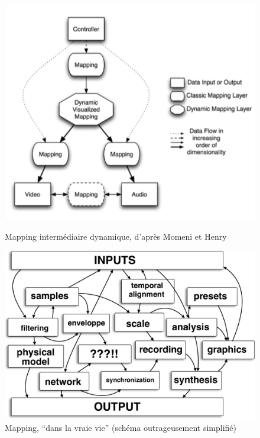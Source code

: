 \begin{figure}[!htbp]
	\captionsetup{format=plain}%
	\centering
	\begin{minipage}[t]{0.48\textwidth}
	 	\includegraphics[width=\linewidth]{gfx/04_algorithms/Momeni-DynamicMappingLayers.png}
		\caption[Représentation du mapping \#3]{Mapping intermédiaire dynamique, d'après Momeni et Henry}
		\label{fig:algorithms:DynamicMappingLayer3}
	\end{minipage}
	\hspace{.02\linewidth}
	\begin{minipage}[t]{0.48\textwidth}
	  \includegraphics[width=\linewidth]{gfx/04_algorithms/mapping-IRL.pdf}
		\caption[Représentation du mapping \#4]{Mapping, ``dans la vraie vie'' (schéma outrageusement simplifié)}
		\label{fig:algorithms:DynamicMappingLayer4}
	\end{minipage}
\end{figure}

